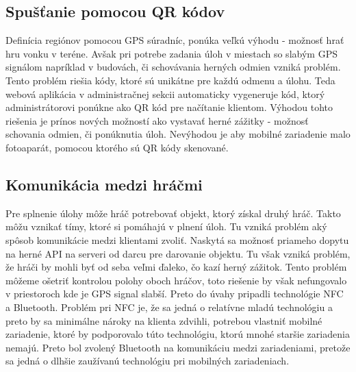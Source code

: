\subsection{Spušťanie pomocou QR kódov}

Definícia regiónov pomocou GPS súradníc, ponúka veľkú výhodu - možnosť hrať hru vonku v teréne. Avšak pri potrebe zadania úloh v miestach so slabým GPS signálom napríklad v budovách, či schovávania herných odmien vzniká problém. Tento problém riešia kódy, ktoré sú unikátne pre každú odmenu a úlohu. Teda webová aplikácia v administračnej sekcii automaticky vygeneruje kód, ktorý administrátorovi ponúkne ako QR kód pre načítanie klientom. Výhodou tohto riešenia je prínos nových možností ako vystavať herné zážitky - možnosť schovania odmien, či ponúknutia úloh. Nevýhodou je aby mobilné zariadenie malo fotoaparát, pomocou ktorého sú QR kódy skenované.

\subsection{Komunikácia medzi hráčmi}
Pre splnenie úlohy môže hráč potrebovať objekt, ktorý získal druhý hráč. Takto môžu vznikať tímy, ktoré si pomáhajú v plnení úloh. Tu vzniká problém aký spôsob komunikácie medzi klientami zvoliť. Naskytá sa možnosť priameho dopytu na herné API na serveri od darcu pre darovanie objektu. Tu však vzniká problém, že hráči by mohli byť od seba veľmi ďaleko, čo kazí herný zážitok. Tento problém môžeme ošetriť kontrolou polohy oboch hráčov, toto riešenie by však nefungovalo v priestoroch kde je GPS signal slabší. Preto do úvahy pripadli technológie NFC a Bluetooth. Problém pri NFC je, že sa jedná o relatívne mladú technológiu a preto by sa minimálne nároky na klienta zdvihli, potrebou vlastniť mobilné zariadenie, ktoré by podporovalo túto technológiu, ktorú mnohé staršie zariadenia nemajú. Preto bol zvolený Bluetooth na komunikáciu medzi zariadeniami, pretože sa jedná o dlhšie zaužívanú technológiu pri mobilných zariadeniach.



